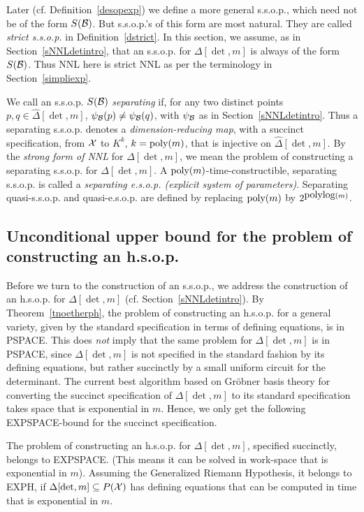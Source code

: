 \documentclass[11pt]{article}
\begin{document}
 Later (cf. Definition~\ref{desopexp}) we  define  a more general s.s.o.p.,
which need not be of the form $S({\cal B})$. But  s.s.o.p.'s  of this form are  most natural. They are 
called {\em strict s.s.o.p.}  in Definition~\ref{dstrict}.
In this section, we assume, as in Section~\ref{sNNLdetintro},
that an s.s.o.p. for
$\Delta[\det,m]$ is always of  the form $S({\cal B})$. 
Thus NNL here is   strict NNL as per the  terminology in  Section~\ref{simpliexp}.


We call an s.s.o.p. $S({\cal B})$ {\em separating} if, for  any two distinct points $p,q \in \hat \Delta[\det,m]$, 
$\psi_{{\cal B}}(p) \not = \psi_{{\cal B}}(q)$, with $\psi_{{\cal B}}$ as in Section~\ref{sNNLdetintro}.  
Thus a separating s.s.o.p. denotes
a {\em dimension-reducing map}, with a succinct specification, from ${\cal X}$ to $K^k$, 
$k={\mbox {poly}}(m)$, that is injective on $\hat \Delta[\det,m]$.  
By the {\em strong form of NNL} for $\Delta[\det,m]$, we mean the problem of constructing a separating s.s.o.p. for
$\Delta[\det,m]$.
A ${\mbox {poly}}(m)$-time-constructible, separating s.s.o.p. is  called 
a   {\em separating e.s.o.p. (explicit system of parameters)}.
Separating quasi-s.s.o.p. and quasi-e.s.o.p. are  defined  by replacing ${\mbox {poly}}(m)$ by  $2^{{\mbox {polylog}}(m)}$.



\subsection{Unconditional upper bound for the problem of constructing an h.s.o.p.} 
Before we turn to the construction of an s.s.o.p., 
we  address the construction of an
h.s.o.p. for $\Delta[\det,m]$ (cf. Section~\ref{sNNLdetintro}).
By Theorem~\ref{tnoetherph}, the problem of constructing an h.s.o.p. for a general  variety, given by the standard specification 
in terms of  defining equations,
is in PSPACE. This does {\em not} imply that the same problem for $\Delta[\det,m]$ is in PSPACE, 
since $\Delta[\det,m]$ is not specified 
in the  standard fashion by its  defining equations, 
but rather succinctly by a small uniform circuit for the determinant.
The current best algorithm based on Gr\"obner basis theory \cite{mayr2} for 
converting the  succinct specification of $\Delta[\det,m]$ to its  standard specification takes  space that is  exponential  in $m$.  
Hence,  we only get the following EXPSPACE-bound for the succinct specification.

\begin{theorem} \label{tnnldetexpspace}
The problem of constructing an h.s.o.p. for $\Delta[\det, m]$, specified succinctly,
belongs to EXPSPACE. (This means it can be solved in work-space that is
exponential in $m$). 
Assuming the Generalized Riemann Hypothesis, it belongs to EXPH,  if $\Delta[\det,m] \subseteq P({\cal X})$ has defining equations
that can be computed in time that is exponential in $m$.
\end{theorem}
\end{document}
